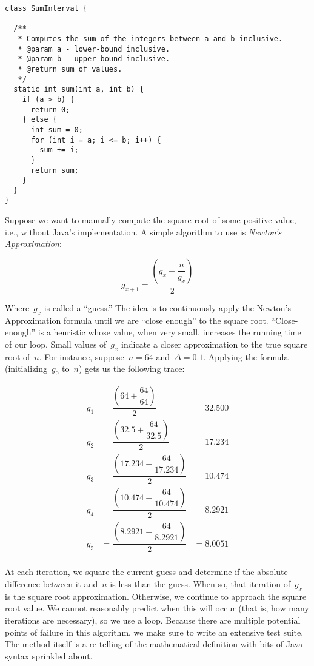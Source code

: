 \begin{lstlisting}[language=MyJava]
class SumInterval {

  /**
   * Computes the sum of the integers between a and b inclusive.
   * @param a - lower-bound inclusive.
   * @param b - upper-bound inclusive.
   * @return sum of values.
   */
  static int sum(int a, int b) {
    if (a > b) { 
      return 0; 
    } else {
      int sum = 0;
      for (int i = a; i <= b; i++) { 
        sum += i; 
      }
      return sum;
    }
  }
}
\end{lstlisting}

Suppose we want to manually compute the square root of some positive value, i.e., without Java's implementation. 
A simple algorithm to use is \emph{Newton's Approximation}:

\[
    g_{x+1} = \dfrac{\left(g_x + \dfrac{n}{g_x}\right)}{2}
\]

Where~$g_x$ is called a ``guess.'' 
The idea is to continuously apply the Newton's Approximation formula until we are ``close enough'' to the square root. 
``Close-enough'' is a heuristic whose value, when very small, increases the running time of our loop. 
Small values of~$g_x$ indicate a closer approximation to the true square root of~$n$. 
For instance, suppose~$n=64$ and~$\Delta=0.1$. 
Applying the formula (initializing~$g_0$ to~$n$) gets us the following trace:

\begin{align*}
g_1 &= \dfrac{\left(64 + \dfrac{64}{64}\right)}{2} &= 32.500\\
g_2 &= \dfrac{\left(32.5 + \dfrac{64}{32.5}\right)}{2} &= 17.234\\
g_3 &= \dfrac{\left(17.234 + \dfrac{64}{17.234}\right)}{2} &= 10.474\\
g_4 &= \dfrac{\left(10.474 + \dfrac{64}{10.474}\right)}{2} &= 8.2921\\
g_5 &= \dfrac{\left(8.2921 + \dfrac{64}{8.2921}\right)}{2} &= 8.0051\\
\end{align*}

At each iteration, we square the current guess and determine if the absolute difference between it and~$n$ is less than the guess. 
When so, that iteration of~$g_x$ is the square root approximation. 
Otherwise, we continue to approach the square root value. 
We cannot reasonably predict when this will occur (that is, how many iterations are necessary), so we use a  loop. 
Because there are multiple potential points of failure in this algorithm, we make sure to write an extensive test suite. 
The method itself is a re-telling of the mathematical definition with bits of Java syntax sprinkled about. 

